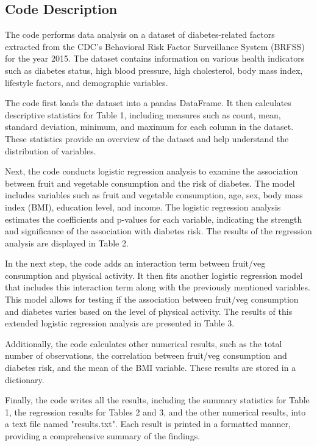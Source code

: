 \documentclass[11pt]{article}
\begin{document}
\subsection*{Code Description}

The code performs data analysis on a dataset of diabetes-related factors extracted from the CDC's Behavioral Risk Factor Surveillance System (BRFSS) for the year 2015. The dataset contains information on various health indicators such as diabetes status, high blood pressure, high cholesterol, body mass index, lifestyle factors, and demographic variables.

The code first loads the dataset into a pandas DataFrame. It then calculates descriptive statistics for Table 1, including measures such as count, mean, standard deviation, minimum, and maximum for each column in the dataset. These statistics provide an overview of the dataset and help understand the distribution of variables.

Next, the code conducts logistic regression analysis to examine the association between fruit and vegetable consumption and the risk of diabetes. The model includes variables such as fruit and vegetable consumption, age, sex, body mass index (BMI), education level, and income. The logistic regression analysis estimates the coefficients and p-values for each variable, indicating the strength and significance of the association with diabetes risk. The results of the regression analysis are displayed in Table 2.

In the next step, the code adds an interaction term between fruit/veg consumption and physical activity. It then fits another logistic regression model that includes this interaction term along with the previously mentioned variables. This model allows for testing if the association between fruit/veg consumption and diabetes varies based on the level of physical activity. The results of this extended logistic regression analysis are presented in Table 3.

Additionally, the code calculates other numerical results, such as the total number of observations, the correlation between fruit/veg consumption and diabetes risk, and the mean of the BMI variable. These results are stored in a dictionary.

Finally, the code writes all the results, including the summary statistics for Table 1, the regression results for Tables 2 and 3, and the other numerical results, into a text file named "results.txt". Each result is printed in a formatted manner, providing a comprehensive summary of the findings.
\end{document}
